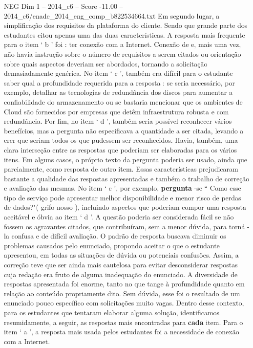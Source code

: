 \begin{textsample}{NEG Dim 1 – 2014\_c6 – Score -11.00 – 2014\_c6/enade\_2014\_eng\_comp\_b822534664.txt}
Em segundo lugar, a simplificação dos requisitos da plataforma do cliente.
Sendo que grande parte dos estudantes citou apenas uma das duas características.
A resposta mais frequente para o item ‘ b ’ foi : ter conexão com a Internet.
Conexão de e, mais uma vez, não havia instrução sobre o número de requisitos a serem citados ou orientação sobre quais aspectos deveriam ser abordados, tornando a solicitação demasiadamente genérica.
No item ‘ c ’, também era difícil para o estudante saber qual a profundidade requerida para a resposta : se seria necessário, por exemplo, detalhar as tecnologias de redundância dos discos para aumentar a confiabilidade do armazenamento ou se bastaria mencionar que os ambientes de Cloud são fornecidos por empresas que detêm infraestrutura robusta e com redundância.
Por fim, no item ‘ d ’, também seria possível reconhecer vários benefícios, mas a pergunta não especificava a quantidade a ser citada, levando a crer que seriam todos os que pudessem ser reconhecidos.
Havia, também, uma clara interseção entre as respostas que poderiam ser elaboradas para os vários itens.
Em alguns casos, o próprio texto da pergunta poderia ser usado, ainda que parcialmente, como resposta de outro item.
Essas características prejudicaram bastante a qualidade das respostas apresentadas e também o trabalho de correção e avaliação das mesmas.
No item ‘ c ’, por exemplo, \textbf{pergunta} -se “ Como esse tipo de serviço pode apresentar melhor disponibilidade e menor risco de perdas de dados?"( grifo nosso ), incluindo aspectos que poderiam compor uma resposta aceitável e óbvia ao item ‘ d ’.
A questão poderia ser considerada fácil se não fossem os agravantes citados, que contribuíram, sem a menor dúvida, para torná -la confusa e de difícil avaliação.
O padrão de resposta buscava diminuir os problemas causados pelo enunciado, propondo aceitar o que o estudante apresentou, em todas as situações de dúvida ou potenciais confusões.
Assim, a correção teve que ser ainda mais cautelosa para evitar desconsiderar respostas cuja redação era fruto de alguma inadequação do enunciado.
A diversidade de respostas apresentada foi enorme, tanto no que tange à profundidade quanto em relação ao conteúdo propriamente dito.
Sem dúvida, esse foi o resultado de um enunciado pouco específico com solicitações muito vagas.
Dentro desse contexto, para os estudantes que tentaram elaborar alguma solução, identificamos resumidamente, a seguir, as respostas mais encontradas para \textbf{cada} item.
Para o item ‘ a ’, a resposta mais usada pelos estudantes foi a necessidade de conexão com a Internet.

\end{textsample}
